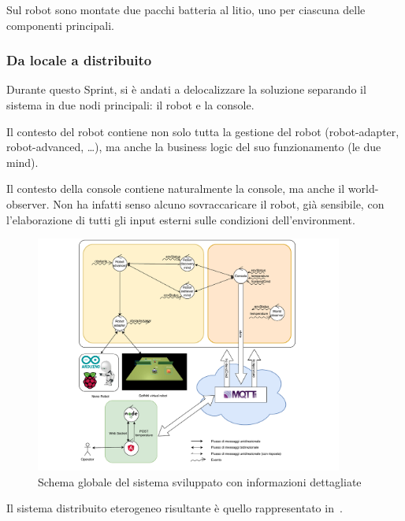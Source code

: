 Sul robot sono montate due pacchi batteria al litio, uno per ciascuna delle componenti principali.

\subsubsection{Da locale a distribuito}

Durante questo Sprint, si è andati a delocalizzare la soluzione separando il sistema in due nodi principali:
il robot e la console.

Il contesto del robot contiene non solo tutta la gestione del robot (robot-adapter, robot-advanced, \ldots), ma anche la business logic del suo funzionamento (le due mind).

Il contesto della console contiene naturalmente la console, ma anche il world-observer.
Non ha infatti senso alcuno sovraccaricare il robot, già sensibile, con l'elaborazione di tutti gli input esterni sulle condizioni dell'environment.

\begin{figure}[H]
  \centering
  \includegraphics[width=0.9\textwidth]{res/system.pdf}%
  \caption{Schema globale del sistema sviluppato con informazioni dettagliate}%
  \label{fig:sp4:system}
\end{figure}

Il sistema distribuito eterogeneo risultante è quello rappresentato in~.


